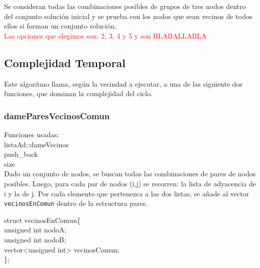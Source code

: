 Se consideran todas las combinaciones posibles de grupos de tres nodos dentro del conjunto soluci\'on inicial y se prueba con los nodos que sean vecinos de todos ellos si forman un conjunto soluci\'on.\\

\textcolor{red}{Las opciones que elegimos son: 2, 3, 4 y 5 y son BLABALLABLA}

\newpage
\subsection{Complejidad Temporal}
Este algoritmo llama, seg\'un la vecindad a ejecutar, a una de las siguiente dos funciones, que dominan la complejidad del ciclo.

\subsubsection{dameParesVecinosComun}\label{vec1}

Funciones usadas:\\
listaAd::dameVecinos\\
push_back\\
size\\

Dado un conjunto de nodos, se buscan todas las combinaciones de pares de nodos posibles. 
Luego, para cada par de nodos (i,j) se recorren: la lista de adyacencia de i y la de j. 
Por cada elemento que pertenezca a las dos listas, se a\~nade al vector \texttt{vecinosEnComun} dentro de la estructura pares.

\begin{algorithm}[h!]
struct vecinosEnComun\{\\
	unsigned int nodoA;\\	
	unsigned int nodoB;\\
	vector<unsigned int> vecinosComun;\\
\};
\end{algorithm}

